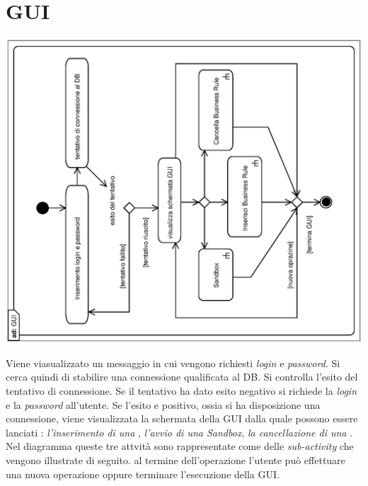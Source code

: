 \documentclass[11pt,titlepage,a4paper]{report}
\begin{document}
\section{GUI}
\begin{center}
 \includegraphics[width=1\textwidth, angle=-90]{GUI.eps}
\end{center}
Viene viasualizzato un messaggio in cui vengono richiesti \textit{login} e \textit{password}. Si cerca quindi di stabilire una connessione 
qualificata al DB. Si controlla l'esito del tentativo di connessione. Se il tentativo ha dato esito negativo si richiede la \textit{login} e la
 \textit{password} all'utente. Se l'esito e positivo, ossia si ha disposizione una connessione, viene visualizzata la schermata della GUI dalla quale
 possono essere lanciati :\textit{ l'inserimento di una \br} , \textit{l'avvio di una Sandbox}, \textit{la cancellazione di una \br} . 
Nel diagramma queste tre attvit\`a sono rappresentate come delle \textit{sub-activity} che vengono illustrate di seguito. al termine dell'operazione 
 l'utente pu\`o effettuare una nuova operazione oppure terminare l'esecuzione della GUI.
\end{document}

